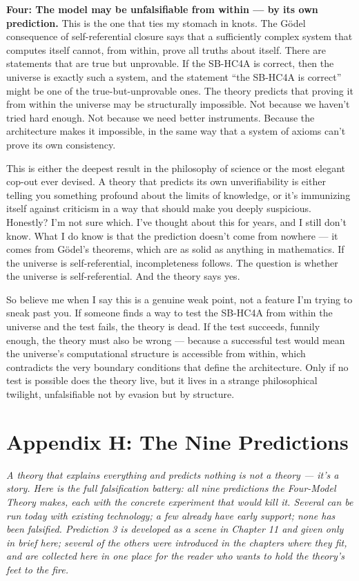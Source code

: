\documentclass[11pt, twoside, openright]{book}
\begin{document}
\textbf{Four: The model may be unfalsifiable from within --- by its own prediction.} This is the one that ties my stomach in knots. The Gödel consequence of self-referential closure says that a sufficiently complex system that computes itself cannot, from within, prove all truths about itself. There are statements that are true but unprovable. If the SB-HC4A is correct, then the universe is exactly such a system, and the statement ``the SB-HC4A is correct'' might be one of the true-but-unprovable ones. The theory predicts that proving it from within the universe may be structurally impossible. Not because we haven't tried hard enough. Not because we need better instruments. Because the architecture makes it impossible, in the same way that a system of axioms can't prove its own consistency.

This is either the deepest result in the philosophy of science or the most elegant cop-out ever devised. A theory that predicts its own unverifiability is either telling you something profound about the limits of knowledge, or it's immunizing itself against criticism in a way that should make you deeply suspicious. Honestly? I'm not sure which. I've thought about this for years, and I still don't know. What I do know is that the prediction doesn't come from nowhere --- it comes from Gödel's theorems, which are as solid as anything in mathematics. If the universe is self-referential, incompleteness follows. The question is whether the universe is self-referential. And the theory says yes.

So believe me when I say this is a genuine weak point, not a feature I'm trying to sneak past you. If someone finds a way to test the SB-HC4A from within the universe and the test fails, the theory is dead. If the test succeeds, funnily enough, the theory must also be wrong --- because a successful test would mean the universe's computational structure is accessible from within, which contradicts the very boundary conditions that define the architecture. Only if no test is possible does the theory live, but it lives in a strange philosophical twilight, unfalsifiable not by evasion but by structure.


\chapter*{Appendix H: The Nine Predictions}

\textit{A theory that explains everything and predicts nothing is not a theory --- it's a story. Here is the full falsification battery: all nine predictions the Four-Model Theory makes, each with the concrete experiment that would kill it. Several can be run today with existing technology; a few already have early support; none has been falsified. Prediction 3 is developed as a scene in Chapter 11 and given only in brief here; several of the others were introduced in the chapters where they fit, and are collected here in one place for the reader who wants to hold the theory's feet to the fire.}
\end{document}
